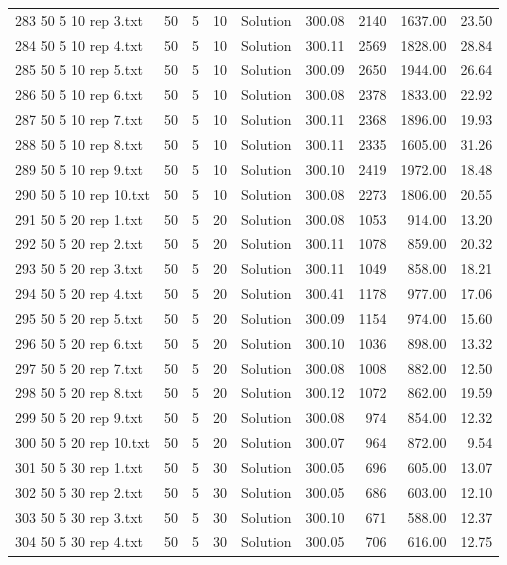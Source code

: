\begin{longtable}{lrrllrrrr}
283 50 5 10 rep 3.txt & 50 & 5 & 10 & Solution & 300.08 & 2140 & 1637.00 & 23.50\\
284 50 5 10 rep 4.txt & 50 & 5 & 10 & Solution & 300.11 & 2569 & 1828.00 & 28.84\\
285 50 5 10 rep 5.txt & 50 & 5 & 10 & Solution & 300.09 & 2650 & 1944.00 & 26.64\\
286 50 5 10 rep 6.txt & 50 & 5 & 10 & Solution & 300.08 & 2378 & 1833.00 & 22.92\\
287 50 5 10 rep 7.txt & 50 & 5 & 10 & Solution & 300.11 & 2368 & 1896.00 & 19.93\\
288 50 5 10 rep 8.txt & 50 & 5 & 10 & Solution & 300.11 & 2335 & 1605.00 & 31.26\\
289 50 5 10 rep 9.txt & 50 & 5 & 10 & Solution & 300.10 & 2419 & 1972.00 & 18.48\\
290 50 5 10 rep 10.txt & 50 & 5 & 10 & Solution & 300.08 & 2273 & 1806.00 & 20.55\\
291 50 5 20 rep 1.txt & 50 & 5 & 20 & Solution & 300.08 & 1053 & 914.00 & 13.20\\
292 50 5 20 rep 2.txt & 50 & 5 & 20 & Solution & 300.11 & 1078 & 859.00 & 20.32\\
293 50 5 20 rep 3.txt & 50 & 5 & 20 & Solution & 300.11 & 1049 & 858.00 & 18.21\\
294 50 5 20 rep 4.txt & 50 & 5 & 20 & Solution & 300.41 & 1178 & 977.00 & 17.06\\
295 50 5 20 rep 5.txt & 50 & 5 & 20 & Solution & 300.09 & 1154 & 974.00 & 15.60\\
296 50 5 20 rep 6.txt & 50 & 5 & 20 & Solution & 300.10 & 1036 & 898.00 & 13.32\\
297 50 5 20 rep 7.txt & 50 & 5 & 20 & Solution & 300.08 & 1008 & 882.00 & 12.50\\
298 50 5 20 rep 8.txt & 50 & 5 & 20 & Solution & 300.12 & 1072 & 862.00 & 19.59\\
299 50 5 20 rep 9.txt & 50 & 5 & 20 & Solution & 300.08 & 974 & 854.00 & 12.32\\
300 50 5 20 rep 10.txt & 50 & 5 & 20 & Solution & 300.07 & 964 & 872.00 &  9.54\\
301 50 5 30 rep 1.txt & 50 & 5 & 30 & Solution & 300.05 & 696 & 605.00 & 13.07\\
302 50 5 30 rep 2.txt & 50 & 5 & 30 & Solution & 300.05 & 686 & 603.00 & 12.10\\
303 50 5 30 rep 3.txt & 50 & 5 & 30 & Solution & 300.10 & 671 & 588.00 & 12.37\\
304 50 5 30 rep 4.txt & 50 & 5 & 30 & Solution & 300.05 & 706 & 616.00 & 12.75\\

\end{longtable}
